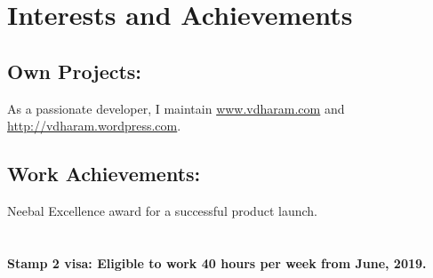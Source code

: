 \documentclass{article}
\begin{document}
\section{\faTrophy{} Interests and Achievements}
\subsection{Own Projects:}
As a passionate developer, I maintain \href{www.vdharam.com}{www.vdharam.com} and \href{http://vdharam.wordpress.com}{http://vdharam.wordpress.com}.
\subsection{Work Achievements:}
Neebal Excellence award for a successful product launch.

\section{}
\bfseries
Stamp 2 visa: Eligible to work 40 hours per week from June, 2019.
\end{document}
